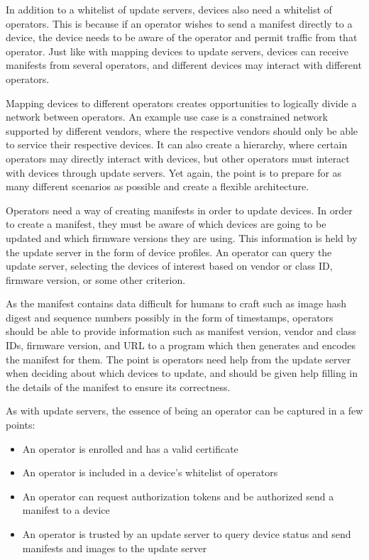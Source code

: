 \documentclass[0-thesis.tex]{subfiles}
\begin{document}
In addition to a whitelist of update servers, devices also need a whitelist of operators.
This is because if an operator wishes to send a manifest directly to a device, the device
needs to be aware of the operator and permit traffic from that operator. Just like with
mapping devices to update servers, devices can receive manifests from several operators,
and different devices may interact with different operators. 

Mapping devices to different operators creates opportunities to logically divide a network
between operators. An example use case is a constrained network supported by different
vendors, where the respective vendors should only be able to service their respective
devices. It can also create a hierarchy, where certain operators may directly interact
with devices, but other operators must interact with devices through update servers. Yet
again, the point is to prepare for as many different scenarios as possible and create a
flexible architecture.

Operators need a way of creating manifests in order to update devices. In order to create
a manifest, they must be aware of which devices are going to be updated and which firmware
versions they are using. This information is held by the update server in the form of
device profiles. An operator can query the update server, selecting the devices of interest
based on vendor or class ID, firmware version, or some other criterion. 

As the manifest contains data difficult for humans to craft such as image hash digest and
sequence numbers possibly in the form of timestamps, operators should be able to provide
information such as manifest version, vendor and class IDs, firmware version, and URL to a
program which then generates and encodes the manifest for them. The point is operators
need help from the update server when deciding about which devices to update, and should
be given help filling in the details of the manifest to ensure its correctness.

As with update servers, the essence of being an operator can be captured in a few points:

\begin{itemize}
    \item An operator is enrolled and has a valid certificate
    \item An operator is included in a device's whitelist of operators
    \item An operator can request authorization tokens and be authorized send a manifest
            to a device
    \item An operator is trusted by an update server to query device status and send
            manifests and images to the update server
\end{itemize}
\end{document}
